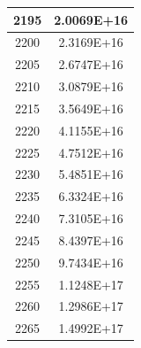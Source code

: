 \documentclass[a4paper]{article}
\begin{document}
\begin{tabular}{|c|c|}
		2195 & 2.0069E+16 \\
		\hline
		2200 & 2.3169E+16 \\
		\hline
		2205 & 2.6747E+16 \\
		\hline
		2210 & 3.0879E+16 \\
		\hline
		2215 & 3.5649E+16 \\
		\hline
		2220 & 4.1155E+16 \\
		\hline
		2225 & 4.7512E+16 \\
		\hline
		2230 & 5.4851E+16 \\
		\hline
		2235 & 6.3324E+16 \\
		\hline
		2240 & 7.3105E+16 \\
		\hline
		2245 & 8.4397E+16 \\
		\hline
		2250 & 9.7434E+16 \\
		\hline
		2255 & 1.1248E+17 \\
		\hline
		2260 & 1.2986E+17 \\
		\hline
		2265 & 1.4992E+17 \\
		\hline
	\end{tabular}
	\hfill
\end{document}
